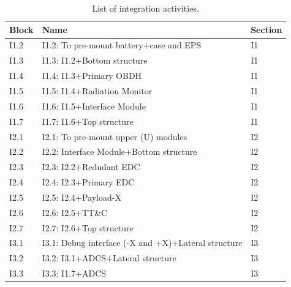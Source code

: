 \begin{table}[!htb]
\caption{\label{table_integration}List of integration activities.}
\centering
\begin{tabular}{|l|l|l|}\hline
	
 	Block  & Name                                                                & Section \\ \hline
        I1.2     & I1.2: To pre-mount battery+case and EPS                           & {I1} \\ \hline
	I1.3     & I1.3: I1.2+Bottom structure                                       
        & {I1} \\ \hline
        I1.4     & I1.4: I1.3+Primary OBDH                                           & {I1} \\ \hline
        I1.5     & I1.5: I1.4+Radiation Monitor                                      & {I1} \\ \hline
        I1.6     & I1.6: I1.5+Interface Module                                       & {I1} \\ \hline
        I1.7     & I1.7: I1.6+Top structure                                          & {I1} \\ \hline
        I2.1     & I2.1: To pre-mount upper (U) modules                              & {I2} \\ \hline
        I2.2     & I2.2: Interface Module+Bottom structure                           & {I2} \\ \hline
        I2.3     & I2.3: I2.2+Redudant EDC                                           & {I2} \\ \hline
        I2.4     & I2.4: I2.3+Primary EDC                                            & {I2} \\ \hline
        I2.5     & I2.5: I2.4+Payload-X                                              & {I2} \\ \hline
        I2.6     & I2.6: I2.5+TT\&C                                                  & {I2} \\ \hline
        I2.7     & I2.7: I2.6+Top structure                                          & {I2} \\ \hline
        I3.1     & I3.1: Debug interface (-X and +X)+Lateral structure               & {I3} \\ \hline
        I3.2     & I3.2: I3.1+ADCS+Lateral structure                                 & {I3} \\ \hline
        I3.3     & I3.3: I1.7+ADCS                                                   & {I3} \\ \hline

\end{tabular}
\end{table}
